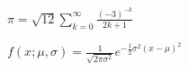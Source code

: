 \documentclass{article}
\begin{document}
\begin{preview}
$ \pi = \sqrt{12}\sum^\infty_{k=0} \frac{ (-3)^{-k} }{ 2k+1 } $
\end{preview}

\begin{preview}
$ f(x; \mu, \sigma) = \frac{1}{\sqrt{2\pi\sigma^2}} e^{-{\frac{1}{2}\sigma^2}(x-\mu)^2} $
\end{preview}
\end{document}
